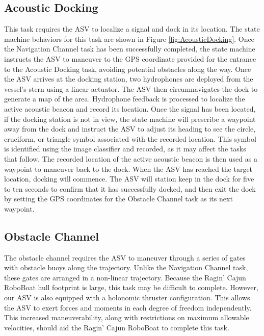\documentclass[letterpaper, 12 pt, conference]{ieeeconf}
\begin{document}
\subsection{Acoustic Docking}
This task requires the ASV to localize a signal and dock in its location. The state machine behaviors for this task are shown in Figure \ref{fig:AcousticDocking}. Once the Navigation Channel task has been successfully completed, the state machine instructs the ASV to maneuver to the GPS coordinate provided for the entrance to the Acoustic Docking task, avoiding potential obstacles along the way. Once the ASV arrives at the docking station, two hydrophones are deployed from the vessel's stern using a linear actuator. The ASV then circumnavigates the dock to generate a map of the area.  Hydrophone feedback is processed to localize the active acoustic beacon and record its location. Once the signal has been located, if the docking station is not in view, the state machine will prescribe a waypoint away from the dock and instruct the ASV to adjust its heading to see the circle, cruciform, or triangle symbol associated with the recorded location. This symbol is identified using the image classifier and recorded, as it may affect the tasks that follow. The recorded location of the active acoustic beacon is then used as a waypoint to maneuver back to the dock. When the ASV has reached the target location, docking will commence. The ASV will station keep in the dock for five to ten seconds to confirm that it has successfully docked, and then exit the dock by setting the GPS coordinates for the Obstacle Channel task as its next waypoint.

\subsection{Obstacle Channel}
\label{ObstacleChannel}
The obstacle channel requires the ASV to maneuver through a series of gates with obstacle buoys along the trajectory. Unlike the Navigation Channel task, these gates are arranged in a non-linear trajectory. Because the Ragin' Cajun RoboBoat hull footprint is large, this task may be difficult to complete. However, our ASV is also equipped with a holonomic thruster configuration. This allows the ASV to exert forces and moments in each degree of freedom independently. This increased maneuverability, along with restrictions on maximum allowable velocities, should aid the Ragin' Cajun RoboBoat to complete this task.
\end{document}
